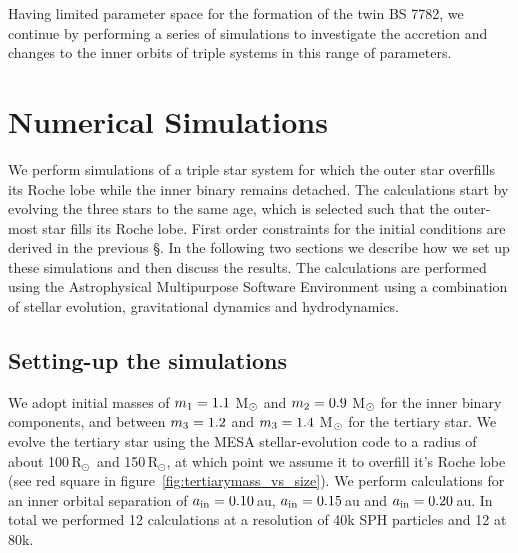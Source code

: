 \documentclass{aastex62}
\newcommand{\RSun}{\mbox{R$_\odot$}}
\begin{document}
Having limited parameter space for the formation of the twin BS 7782, we continue by performing a series of simulations to
investigate the accretion and changes to the inner orbits of triple
systems in this range of parameters.

\section{Numerical Simulations} \label{sims}

We perform simulations of a triple star system for which the outer
star overfills its Roche lobe while the inner binary remains
detached. The calculations start by evolving the three stars to the
same age, which is selected such that the outer-most star fills its
Roche lobe.  First order constraints for the initial conditions are
derived in the previous \S. In the following two sections we describe
how we set up these simulations and then discuss the results. The
calculations are performed using the Astrophysical Multipurpose
Software Environment using a combination of stellar evolution,
gravitational dynamics and hydrodynamics.

\subsection{Setting-up the simulations}

We adopt initial masses of $m_{\rm 1} = 1.1$ M$_{\rm \odot}$ and
$m_{\rm 2} = 0.9$ M$_{\rm \odot}$ for the inner binary components, and
between $m_{\rm 3} = 1.2$ and $m_{\rm 3} = 1.4$ M$_{\rm \odot}$ for
the tertiary star.  We evolve the tertiary star using the MESA
stellar-evolution code \cite{2011ApJS..192....3P} to a radius of about
100\,\RSun\, and 150\,\RSun, at which point we assume it to overfill
it's Roche lobe (see red square in
figure~\ref{fig:tertiarymass_vs_size}).  We perform calculations for an
inner orbital separation of $a_{\rm in} = 0.10$\,au, $a_{\rm in} =
0.15$\,au and $a_{\rm in} = 0.20$\,au.  In total we performed 12
calculations at a resolution of 40k SPH particles and 12 at 80k.
\end{document}

